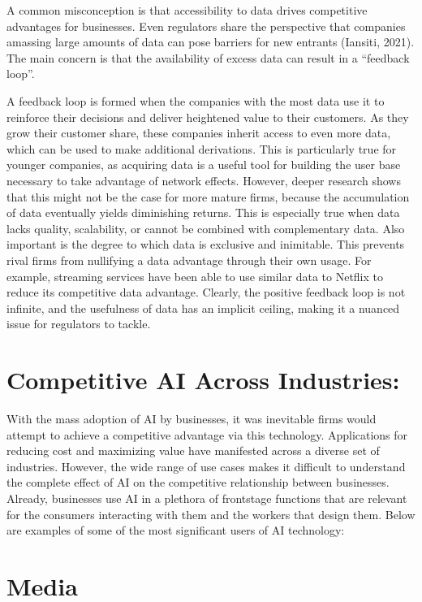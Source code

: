 \documentclass[
]{book}
\begin{document}
A common misconception is that accessibility to data drives competitive advantages for businesses. Even regulators share the perspective that companies amassing large amounts of data can pose barriers for new entrants (Iansiti, 2021). The main concern is that the availability of excess data can result in a ``feedback loop''.

A feedback loop is formed when the companies with the most data use it to reinforce their decisions and deliver heightened value to their customers. As they grow their customer share, these companies inherit access to even more data, which can be used to make additional derivations. This is particularly true for younger companies, as acquiring data is a useful tool for building the user base necessary to take advantage of network effects. However, deeper research shows that this might not be the case for more mature firms, because the accumulation of data eventually yields diminishing returns. This is especially true when data lacks quality, scalability, or cannot be combined with complementary data. Also important is the degree to which data is exclusive and inimitable. This prevents rival firms from nullifying a data advantage through their own usage. For example, streaming services have been able to use similar data to Netflix to reduce its competitive data advantage. Clearly, the positive feedback loop is not infinite, and the usefulness of data has an implicit ceiling, making it a nuanced issue for regulators to tackle.

\hypertarget{competitive-ai-across-industries}{%
\section{Competitive AI Across Industries:}\label{competitive-ai-across-industries}}

With the mass adoption of AI by businesses, it was inevitable firms would attempt to achieve a competitive advantage via this technology. Applications for reducing cost and maximizing value have manifested across a diverse set of industries. However, the wide range of use cases makes it difficult to understand the complete effect of AI on the competitive relationship between businesses. Already, businesses use AI in a plethora of frontstage functions that are relevant for the consumers interacting with them and the workers that design them. Below are examples of some of the most significant users of AI technology:

\hypertarget{media}{%
\section{Media}\label{media}}
\end{document}
